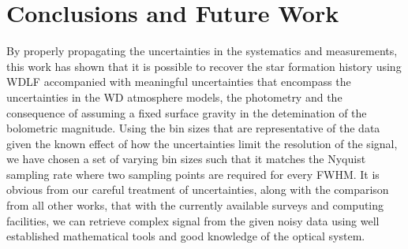 \documentclass[fleqn,usenatbib]{mnras}
\begin{document}
\section{Conclusions and Future Work}
\label{sec:conclusion}
By properly propagating the uncertainties in the systematics and measurements,
this work has shown that it is possible to recover the star formation history 
using WDLF accompanied with meaningful uncertainties that encompass the 
uncertainties in the WD atmosphere models, the photometry and the consequence
of assuming a fixed surface gravity in the detemination of the bolometric 
magnitude. Using the bin sizes that are representative of the data given the
known effect of how the uncertainties limit the resolution of the signal, we
have chosen a set of varying bin sizes such that it matches the Nyquist
sampling rate where two sampling points are required for every FWHM. It is 
obvious from our careful treatment of uncertainties, along with the comparison 
from all other works, that with the currently available surveys and computing
facilities, we can retrieve complex signal from the given noisy data using well 
established mathematical tools and good knowledge of the optical system.
\end{document}
